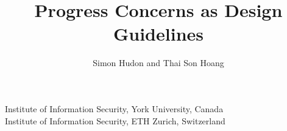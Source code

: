 \newcommand\PREAMBLE{}
{
  \usepackage{fullpage}
  \usepackage{pgf}
  \usepackage{hyperref}
}

{
}

\usepackage[english]{babel}

\usepackage[latin1]{inputenc}
\usepackage{times}
\usepackage[T1]{fontenc}

\usepackage{amsmath}
\usepackage{amssymb}
\usepackage[colour, nobox]{eventB}
\usepackage{bsymb}
\usepackage{spacing}
\usepackage{unitb}
\usepackage{unity}
\usepackage{ltl}
\usepackage[compact]{reqdoc}
\usepackage{reasoning}
\usepackage{tikz}
\usetikzlibrary{snakes,arrows}

\newcommand{\Conv}[2]{\vdash \textsf{$#1$ is convergent in $#2$}}
\newcommand{\Div}[2]{\vdash \textsf{$#1$ is divergent in $#2$}}
\newcommand{\DLF}[2]{\vdash \textsf{$#1$ is deadlock-free in $#2$}}
\newcommand{\LeadsFrom}[3]{\vdash \textsf{$#1$ leads from $#2$ to $#3$}}
\newcommand{\Pred}{P}
\newcommand{\Mch}{\Bmch{M}}

\title[The Unit-B Modelling Method]
{Progress Concerns as Design Guidelines}


\author[S.~Hudon and T.S.~Hoang] %
{Simon Hudon and Thai Son Hoang}

{
  Institute of Information Security, York University, Canada \\
  Institute of Information Security, ETH Zurich, Switzerland
}

